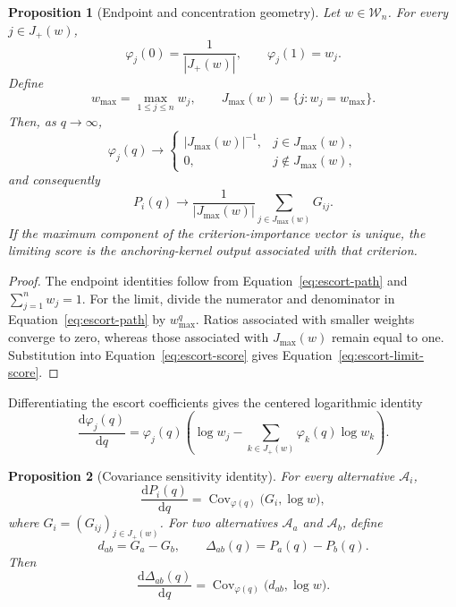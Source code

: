 \documentclass[reqno,11pt]{amsart}
\theoremstyle{definition}
\theoremstyle{plain}
\newtheorem{proposition}{Proposition}
\theoremstyle{remark}
\begin{document}
\begin{proposition}[Endpoint and concentration geometry]
\label{prop:escort-endpoints}
Let \(w\in\mathcal W_n\). For every \(j\in J_{+}(w)\),
\[
\varphi_j(0)=\frac{1}{|J_{+}(w)|},
\qquad
\varphi_j(1)=w_j.
\]
Define
\[
w_{\max}=\max_{1\leq j\leq n}w_j,
\qquad
J_{\max}(w)=\{j:w_j=w_{\max}\}.
\]
Then, as \(q\to\infty\),
\[
\varphi_j(q)
\longrightarrow
\begin{cases}
|J_{\max}(w)|^{-1}, & j\in J_{\max}(w),\\
0, & j\notin J_{\max}(w),
\end{cases}
\]
and consequently
\begin{equation}
P_i(q)
\longrightarrow
\frac{1}{|J_{\max}(w)|}
\sum_{j\in J_{\max}(w)}G_{ij}.
\label{eq:escort-limit-score}
\end{equation}
If the maximum component of the criterion-importance vector is unique,
the limiting score is the anchoring-kernel output associated with that
criterion.
\end{proposition}

\begin{proof}
The endpoint identities follow from Equation~\eqref{eq:escort-path} and
\(\sum_{j=1}^{n}w_j=1\). For the limit, divide the numerator and denominator
in Equation~\eqref{eq:escort-path} by \(w_{\max}^{q}\). Ratios associated
with smaller weights converge to zero, whereas those associated with
\(J_{\max}(w)\) remain equal to one. Substitution into
Equation~\eqref{eq:escort-score} gives
Equation~\eqref{eq:escort-limit-score}.
\end{proof}

Differentiating the escort coefficients gives the centered logarithmic
identity
\begin{equation}
\frac{\mathrm d\varphi_j(q)}{\mathrm dq}
=
\varphi_j(q)
\left(
\log w_j
-
\sum_{k\in J_{+}(w)}\varphi_k(q)\log w_k
\right).
\label{eq:escort-phi-derivative}
\end{equation}

\begin{proposition}[Covariance sensitivity identity]
\label{prop:escort-covariance}
For every alternative \(\mathcal A_i\),
\begin{equation}
\frac{\mathrm dP_i(q)}{\mathrm dq}
=
\operatorname{Cov}_{\varphi(q)}
\bigl(G_i,\log w\bigr),
\label{eq:escort-score-derivative}
\end{equation}
where \(G_i=(G_{ij})_{j\in J_{+}(w)}\). For two alternatives
\(\mathcal A_a\) and \(\mathcal A_b\), define
\[
d_{ab}=G_a-G_b,
\qquad
\Delta_{ab}(q)=P_a(q)-P_b(q).
\]
Then
\begin{equation}
\frac{\mathrm d\Delta_{ab}(q)}{\mathrm dq}
=
\operatorname{Cov}_{\varphi(q)}
\bigl(d_{ab},\log w\bigr).
\label{eq:escort-gap-derivative}
\end{equation}
\end{proposition}
\end{document}
